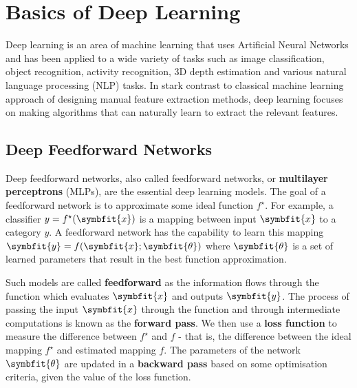 \chapter{Basics of Deep Learning} \label{chap:basics-of-dl}

Deep learning is an area of machine learning that uses Artificial Neural Networks \cite{mcculloch1943logical} and has been applied to a wide variety of tasks such as image classification, object recognition, activity recognition, 3D depth estimation and various natural language processing (NLP) tasks. In stark contrast to classical machine learning approach of designing manual feature extraction methods, deep learning focuses on making algorithms that can naturally learn to extract the relevant features.

\section{Deep Feedforward Networks} \label{sec:feed-forward-nets}

Deep feedforward networks, also called feedforward networks, or \textbf{multilayer perceptrons} (MLPs), are the essential deep learning models. The goal of a feedforward network is to approximate some ideal function \(f^\star\). 
For example, a classifier \(y = f^\star(\symbfit{x})\) is a mapping between input $\symbfit{x}$ to a category $y$. A feedforward network has the capability to learn this mapping \(\symbfit{y} = f(\symbfit{x}; \symbfit{\theta})\) where $\symbfit{\theta}$ is a set of learned parameters that result in the best function approximation.

Such models are called \textbf{feedforward} as the information flows through the function which evaluates $\symbfit{x}$ and outputs $\symbfit{y}$. The process of passing the input $\symbfit{x}$ through the function and through intermediate computations is known as the \textbf{forward pass}. We then use a \textbf{loss function} to measure the difference between $f^\star$ and $f$ - that is, the difference between the ideal mapping $f^\star$ and estimated mapping $f$. The parameters of the network $\symbfit{\theta}$ are updated in a \textbf{backward pass} based on some optimisation criteria, given the value of the loss function. 


